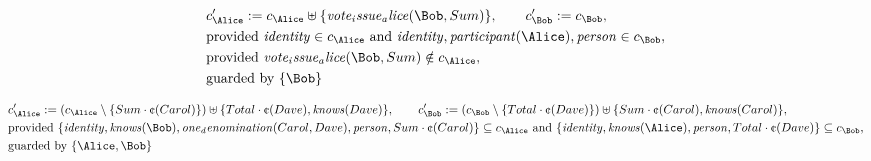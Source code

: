 \begin{align*}
&
c'_
{
\Alice
}
 := 
c_
{
\Alice
}
 \uplus 
\{
\mathit{
vote_issue_alice
}
(
\Bob
,
Sum
)
\}
, \qquad 
c'_
{
\Bob
}
 := 
c_
{
\Bob
}
,\\
&
\text{provided } 
\mathit{
identity
}
 \in c_
{
\Alice
}
 \text{ and } 
\mathit{
identity
}
,
\mathit{
participant
}
(
\Alice
)
,
\mathit{
person
}
 \in c_
{
\Bob
}
,\\
&
\text{provided } 
\mathit{
vote_issue_alice
}
(
\Bob
,
Sum
)
 \notin c_
{
\Alice
}
,\\
&
\text{guarded by } \{
\Bob
\}
\end{align*}

\begin{align*}
&
c'_
{
\Alice
}
 := 
(c_
{
\Alice
}
 \setminus 
\{
Sum
\cdot
\text{\textcent}
(
Carol
)
\}
) \uplus 
\{
Total
\cdot
\text{\textcent}
(
Dave
)
,
\mathit{
knows
}
(
Dave
)
\}
, \qquad 
c'_
{
\Bob
}
 := 
(c_
{
\Bob
}
 \setminus 
\{
Total
\cdot
\text{\textcent}
(
Dave
)
\}
) \uplus 
\{
Sum
\cdot
\text{\textcent}
(
Carol
)
,
\mathit{
knows
}
(
Carol
)
\}
,\\
&
\text{provided } 
\{
\mathit{
identity
}
,
\mathit{
knows
}
(
\Bob
)
,
\mathit{
one_denomination
}
(
Carol
,
Dave
)
,
\mathit{
person
}
,
Sum
\cdot
\text{\textcent}
(
Carol
)
\}
 \subseteq c_
{
\Alice
}
 \text{ and } 
\{
\mathit{
identity
}
,
\mathit{
knows
}
(
\Alice
)
,
\mathit{
person
}
,
Total
\cdot
\text{\textcent}
(
Dave
)
\}
 \subseteq c_
{
\Bob
}
,\\
&
\text{guarded by } \{
\Alice
,
\Bob
\}
\end{align*}

